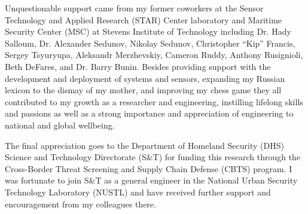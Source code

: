 \documentclass[11pt]{report}
\begin{document}
Unquestionable support came from my former coworkers at the Sensor Technology and Applied Research (STAR) Center laboratory and Maritime Security Center (MSC) at Stevens Institute of Technology including Dr. Hady Salloum, Dr. Alexander Sedunov, Nikolay Sedunov, Christopher ``Kip'' Francis, Sergey Tsyuryupa, Aleksandr Merzhevskiy, Cameron Ruddy, Anthony Rusignioli, Beth DeFares, and Dr. Barry Bunin. Besides providing support with the development and deployment of systems and sensors, expanding my Russian lexicon to the dismay of my mother, and improving my chess game they all contributed to my growth as a researcher and engineering, instilling lifelong skills and passions as well as a strong importance and appreciation of engineering to national and global wellbeing.

The final appreciation goes to the Department of Homeland Security (DHS) Science and Technology Directorate (S\&T) for funding this research through the Cross-Border Threat Screening and Supply Chain Defense (CBTS) program. I was fortunate to join S\&T as a general engineer in the National Urban Security Technology Laboratory (NUSTL) and have received further support and encouragement from my colleagues there. 




\end{document}

